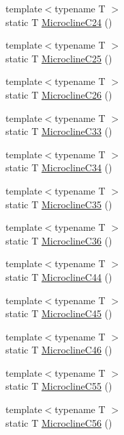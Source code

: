 \begin{DoxyCompactItemize}
{\footnotesize template$<$typename T $>$ }\\static T \mbox{\hyperlink{namespacempc_1_1data_a67e195b3029c75ee485052379f0f089c}{Microcline\+C24}} ()
\item 
{\footnotesize template$<$typename T $>$ }\\static T \mbox{\hyperlink{namespacempc_1_1data_a8528a782758cc2f87e96e85806db5348}{Microcline\+C25}} ()
\item 
{\footnotesize template$<$typename T $>$ }\\static T \mbox{\hyperlink{namespacempc_1_1data_a6155e1982a7b7e3303c621ba5dfe07ac}{Microcline\+C26}} ()
\item 
{\footnotesize template$<$typename T $>$ }\\static T \mbox{\hyperlink{namespacempc_1_1data_a9a8b16ee013b5b86564154beacd24317}{Microcline\+C33}} ()
\item 
{\footnotesize template$<$typename T $>$ }\\static T \mbox{\hyperlink{namespacempc_1_1data_a1befb374e20df05fd928ae98a159ec53}{Microcline\+C34}} ()
\item 
{\footnotesize template$<$typename T $>$ }\\static T \mbox{\hyperlink{namespacempc_1_1data_afc82dd5dfd352863a9dd8a7773c7038a}{Microcline\+C35}} ()
\item 
{\footnotesize template$<$typename T $>$ }\\static T \mbox{\hyperlink{namespacempc_1_1data_a886067f6f068bd9da6beccdae4eb6123}{Microcline\+C36}} ()
\item 
{\footnotesize template$<$typename T $>$ }\\static T \mbox{\hyperlink{namespacempc_1_1data_aed65d64fa6ca08a20c0dfe518f5f3a9e}{Microcline\+C44}} ()
\item 
{\footnotesize template$<$typename T $>$ }\\static T \mbox{\hyperlink{namespacempc_1_1data_aaac15ae6bad382ff8c341ef2614ccad8}{Microcline\+C45}} ()
\item 
{\footnotesize template$<$typename T $>$ }\\static T \mbox{\hyperlink{namespacempc_1_1data_aa40450fc10137e223516e404d83deabe}{Microcline\+C46}} ()
\item 
{\footnotesize template$<$typename T $>$ }\\static T \mbox{\hyperlink{namespacempc_1_1data_acf54811bdf54a84e396e7c02e5dd5dc1}{Microcline\+C55}} ()
\item 
{\footnotesize template$<$typename T $>$ }\\static T \mbox{\hyperlink{namespacempc_1_1data_a94a175419bc1d1795da26704fc110e44}{Microcline\+C56}} ()

\end{DoxyCompactItemize}
